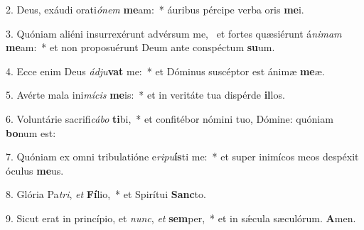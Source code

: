 2. Deus, exáudi orati\textit{ó}\textit{nem} \textbf{me}am:~*  áuribus pércipe verba oris \textbf{me}i.\

3. Quóniam aliéni insurrexérunt advérsum me, \dag\  et fortes quæsiérunt á\textit{ni}\textit{mam} \textbf{me}am:~*  et non proposuérunt Deum ante conspéctum \textbf{su}um.\

4. Ecce enim Deus \textit{ád}\textit{ju}\textbf{vat} me:~*  et Dóminus suscéptor est ánimæ \textbf{me}æ.\

5. Avérte mala ini\textit{mí}\textit{cis} \textbf{me}is:~*  et in veritáte tua dispérde \textbf{il}los.\

6. Voluntárie sacrifi\textit{cá}\textit{bo} \textbf{ti}bi,~*  et confitébor nómini tuo, Dómine: quóniam \textbf{bo}num est:\

7. Quóniam ex omni tribulatióne e\textit{ri}\textit{pu}\textbf{ís}ti me:~*  et super inimícos meos despéxit óculus \textbf{me}us.\

8. Glória Pa\textit{tri}, \textit{et} \textbf{Fí}lio,~*  et Spirítui \textbf{Sanc}to.\

9. Sicut erat in princípio, et \textit{nunc}, \textit{et} \textbf{sem}per,~*  et in sǽcula sæculórum. \textbf{A}men.\

